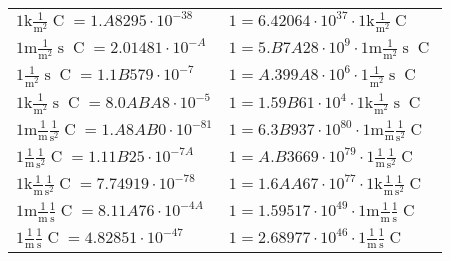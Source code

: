 \begin{center}
\begin{longtable}{l l}
{\color{gray}$1 \bm{\mathrm{ k}}\frac1{\operatorname{m}^2}{}{\operatorname{C}}{} = 1.A8295\cdot10^{-38} $}   & {\color{gray}$ 1 = 6.42064\cdot10^{37} \cdot 1 \bm{\mathrm{ k}}\frac1{\operatorname{m}^2}{}{\operatorname{C}}{}$}  \\
{\color{gray}$1 \bm{\mathrm{ m}}\frac1{\operatorname{m}^2}{\operatorname{s}}{\operatorname{C}}{} = 2.01481\cdot10^{-A} $}   & {\color{gray}$ 1 = 5.B7A28\cdot10^{9} \cdot 1 \bm{\mathrm{ m}}\frac1{\operatorname{m}^2}{\operatorname{s}}{\operatorname{C}}{}$}  \\
{\color{black}$1 \bm{\mathrm{ }}\frac1{\operatorname{m}^2}{\operatorname{s}}{\operatorname{C}}{} = 1.1B579\cdot10^{-7} $}   & {\color{black}$ 1 = A.399A8\cdot10^{6} \cdot 1 \bm{\mathrm{ }}\frac1{\operatorname{m}^2}{\operatorname{s}}{\operatorname{C}}{}$}  \\
{\color{gray}$1 \bm{\mathrm{ k}}\frac1{\operatorname{m}^2}{\operatorname{s}}{\operatorname{C}}{} = 8.0ABA8\cdot10^{-5} $}   & {\color{gray}$ 1 = 1.59B61\cdot10^{4} \cdot 1 \bm{\mathrm{ k}}\frac1{\operatorname{m}^2}{\operatorname{s}}{\operatorname{C}}{}$}  \\
{\color{gray}$1 \bm{\mathrm{ m}}\frac1{\operatorname{m}}\frac1{\operatorname{s}^2}{\operatorname{C}}{} = 1.A8AB0\cdot10^{-81} $}   & {\color{gray}$ 1 = 6.3B937\cdot10^{80} \cdot 1 \bm{\mathrm{ m}}\frac1{\operatorname{m}}\frac1{\operatorname{s}^2}{\operatorname{C}}{}$}  \\
{\color{black}$1 \bm{\mathrm{ }}\frac1{\operatorname{m}}\frac1{\operatorname{s}^2}{\operatorname{C}}{} = 1.11B25\cdot10^{-7A} $}   & {\color{black}$ 1 = A.B3669\cdot10^{79} \cdot 1 \bm{\mathrm{ }}\frac1{\operatorname{m}}\frac1{\operatorname{s}^2}{\operatorname{C}}{}$}  \\
{\color{gray}$1 \bm{\mathrm{ k}}\frac1{\operatorname{m}}\frac1{\operatorname{s}^2}{\operatorname{C}}{} = 7.74919\cdot10^{-78} $}   & {\color{gray}$ 1 = 1.6AA67\cdot10^{77} \cdot 1 \bm{\mathrm{ k}}\frac1{\operatorname{m}}\frac1{\operatorname{s}^2}{\operatorname{C}}{}$}  \\
{\color{gray}$1 \bm{\mathrm{ m}}\frac1{\operatorname{m}}\frac1{\operatorname{s}}{\operatorname{C}}{} = 8.11A76\cdot10^{-4A} $}   & {\color{gray}$ 1 = 1.59517\cdot10^{49} \cdot 1 \bm{\mathrm{ m}}\frac1{\operatorname{m}}\frac1{\operatorname{s}}{\operatorname{C}}{}$}  \\
{\color{black}$1 \bm{\mathrm{ }}\frac1{\operatorname{m}}\frac1{\operatorname{s}}{\operatorname{C}}{} = 4.82851\cdot10^{-47} $}   & {\color{black}$ 1 = 2.68977\cdot10^{46} \cdot 1 \bm{\mathrm{ }}\frac1{\operatorname{m}}\frac1{\operatorname{s}}{\operatorname{C}}{}$}  \\

\end{longtable}
\end{center}
